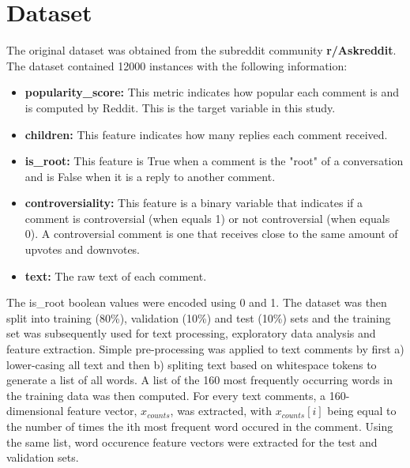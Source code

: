 \documentclass[11pt]{article}
\begin{document}
\section{Dataset}

The original dataset was obtained from the subreddit community \textbf{r/Askreddit}. The dataset contained 12000 instances  with the following information:

\begin{itemize}
    	\item \textbf{popularity\_score:} This metric indicates how popular each comment is and is computed by Reddit. This is the target variable in this study. 
   	\item \textbf{children:} This feature indicates how many replies each comment received.
    	\item \textbf{is\_root:} This feature is True when a comment is the "root" of a conversation and is False when it is a reply to another comment.
    	\item \textbf{controversiality:} This feature is a binary variable that indicates if a comment is controversial (when equals 1) or not controversial (when equals 0). A controversial comment is one that receives close to the same amount of upvotes and downvotes.
    	\item \textbf{text:} The raw text of each comment.
\end{itemize}

The is\_root boolean values were encoded using 0 and 1.  The dataset was then split into training (80\%), validation (10\%) and test (10\%) sets and the training set was subsequently used for text processing, exploratory data analysis and feature extraction. Simple pre-processing was applied to text comments by first a) lower-casing all text and then b) spliting text based on whitespace tokens to generate a list of all words. A list of the 160 most frequently occurring words in the training data was then computed. For every text comments, a 160-dimensional feature vector, $x_{counts}$, was extracted, with $x_{counts}[i]$ being equal to the number of times the ith most frequent word occured in the comment. Using the same list, word occurence feature vectors were extracted for the test and validation sets. 
\\
\end{document}
